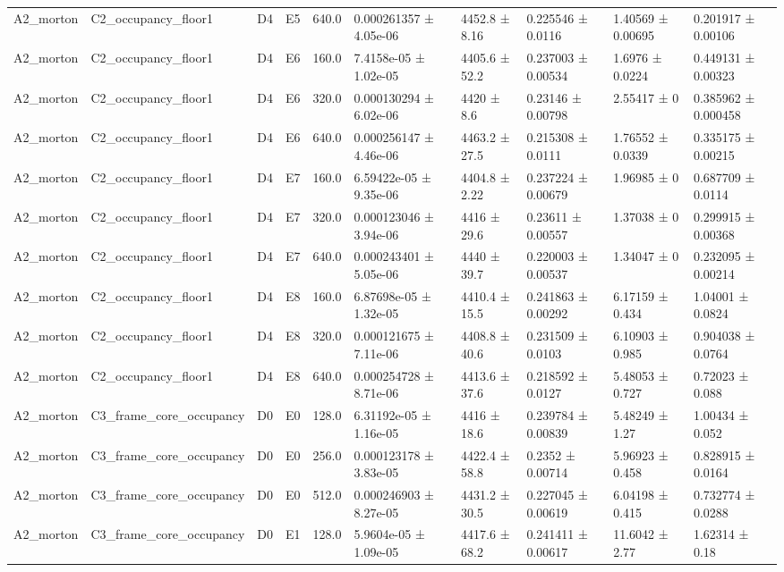 \begin{table}
\begin{tabular}{llllllllll}
A2\_morton & C2\_occupancy\_floor1 & D4 & E5 & 640.0 & 0.000261357 ± 4.05e-06 & 4452.8 ± 8.16 & 0.225546 ± 0.0116 & 1.40569 ± 0.00695 & 0.201917 ± 0.00106 \\
A2\_morton & C2\_occupancy\_floor1 & D4 & E6 & 160.0 & 7.4158e-05 ± 1.02e-05 & 4405.6 ± 52.2 & 0.237003 ± 0.00534 & 1.6976 ± 0.0224 & 0.449131 ± 0.00323 \\
A2\_morton & C2\_occupancy\_floor1 & D4 & E6 & 320.0 & 0.000130294 ± 6.02e-06 & 4420 ± 8.6 & 0.23146 ± 0.00798 & 2.55417 ± 0 & 0.385962 ± 0.000458 \\
A2\_morton & C2\_occupancy\_floor1 & D4 & E6 & 640.0 & 0.000256147 ± 4.46e-06 & 4463.2 ± 27.5 & 0.215308 ± 0.0111 & 1.76552 ± 0.0339 & 0.335175 ± 0.00215 \\
A2\_morton & C2\_occupancy\_floor1 & D4 & E7 & 160.0 & 6.59422e-05 ± 9.35e-06 & 4404.8 ± 2.22 & 0.237224 ± 0.00679 & 1.96985 ± 0 & 0.687709 ± 0.0114 \\
A2\_morton & C2\_occupancy\_floor1 & D4 & E7 & 320.0 & 0.000123046 ± 3.94e-06 & 4416 ± 29.6 & 0.23611 ± 0.00557 & 1.37038 ± 0 & 0.299915 ± 0.00368 \\
A2\_morton & C2\_occupancy\_floor1 & D4 & E7 & 640.0 & 0.000243401 ± 5.05e-06 & 4440 ± 39.7 & 0.220003 ± 0.00537 & 1.34047 ± 0 & 0.232095 ± 0.00214 \\
A2\_morton & C2\_occupancy\_floor1 & D4 & E8 & 160.0 & 6.87698e-05 ± 1.32e-05 & 4410.4 ± 15.5 & 0.241863 ± 0.00292 & 6.17159 ± 0.434 & 1.04001 ± 0.0824 \\
A2\_morton & C2\_occupancy\_floor1 & D4 & E8 & 320.0 & 0.000121675 ± 7.11e-06 & 4408.8 ± 40.6 & 0.231509 ± 0.0103 & 6.10903 ± 0.985 & 0.904038 ± 0.0764 \\
A2\_morton & C2\_occupancy\_floor1 & D4 & E8 & 640.0 & 0.000254728 ± 8.71e-06 & 4413.6 ± 37.6 & 0.218592 ± 0.0127 & 5.48053 ± 0.727 & 0.72023 ± 0.088 \\
A2\_morton & C3\_frame\_core\_occupancy & D0 & E0 & 128.0 & 6.31192e-05 ± 1.16e-05 & 4416 ± 18.6 & 0.239784 ± 0.00839 & 5.48249 ± 1.27 & 1.00434 ± 0.052 \\
A2\_morton & C3\_frame\_core\_occupancy & D0 & E0 & 256.0 & 0.000123178 ± 3.83e-05 & 4422.4 ± 58.8 & 0.2352 ± 0.00714 & 5.96923 ± 0.458 & 0.828915 ± 0.0164 \\
A2\_morton & C3\_frame\_core\_occupancy & D0 & E0 & 512.0 & 0.000246903 ± 8.27e-05 & 4431.2 ± 30.5 & 0.227045 ± 0.00619 & 6.04198 ± 0.415 & 0.732774 ± 0.0288 \\
A2\_morton & C3\_frame\_core\_occupancy & D0 & E1 & 128.0 & 5.9604e-05 ± 1.09e-05 & 4417.6 ± 68.2 & 0.241411 ± 0.00617 & 11.6042 ± 2.77 & 1.62314 ± 0.18 \\

\end{tabular}
\end{table}
